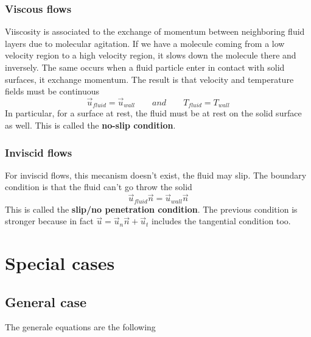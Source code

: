 		\subsubsection{Viscous flows}
			Viiscosity is associated to the exchange of momentum between neighboring fluid layers due to molecular agitation. If we have a molecule coming from a low velocity region to a high velocity region, it slows down the molecule there and inversely. The same occurs when a fluid particle enter in contact with solid surfaces, it exchange momentum. The result is that velocity and temperature fields must be continuous 
			\begin{equation}
				\vec{u}_{fluid} = \vec{u}_{wall} \qquad and \qquad T_{fluid} = T_{wall}
			\end{equation}
			In particular, for a surface at rest, the fluid must be at rest on the solid surface as well. This is called the \textbf{no-slip condition}. 
		
		\subsubsection{Inviscid flows} 
			For inviscid flows, this mecanism doesn't exist, the fluid may slip. The boundary condition is that the fluid can't go throw the solid
			\begin{equation}
				\vec{u}_{fluid}\vec{n} = \vec{u}_{wall}\vec{n}
			\end{equation}
			This is called the \textbf{slip/no penetration condition}. The previous condition is stronger because in fact $\vec{u} = \vec{u}_n\vec{n}+\vec{u}_t$ includes the tangential condition too. 
			
\section{Special cases}
	\subsection{General case}
		The generale equations are the following
